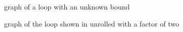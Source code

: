 \begin{figure}[h]
    \centering
    \begin{adjustbox}{max width=\textwidth}
        \centering
        
    \end{adjustbox}
    \caption{\libFIRM{} graph of a loop with an unknown bound}
    \label{fig:impl:unroll:unroll-factor-2-before}
\end{figure}
\begin{figure}[h]
    \centering
    \begin{adjustbox}{max width=\textwidth}
        \centering
        
    \end{adjustbox}
    \caption{\libFIRM{} graph of the loop shown in  unrolled with a factor of two}
    \label{fig:impl:unroll:unroll-factor-2-after}
\end{figure}